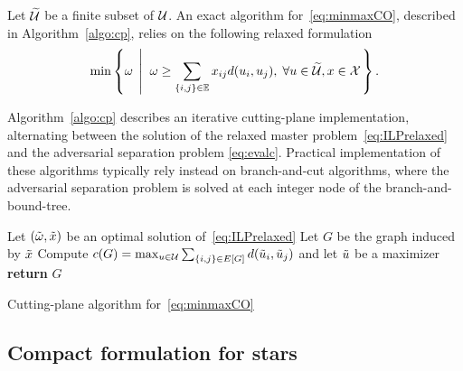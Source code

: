 \documentclass[12pt]{article}
\begin{document}
Let $\widetilde{\mathcal{U}}$ be a finite subset of $\mathcal{U}$. An exact algorithm for~\ref{eq:minmaxCO}, described in Algorithm~\ref{algo:cp}, relies on the following relaxed formulation
\begin{equation}
\label{eq:ILPrelaxed}
\min\left\{\omega \; \left|\;\; \omega \geq \sum_{\{i,j\}\in \mathbb{E}} x_{ij} d(u_i,u_j), \; \forall u\in\widetilde{\mathcal{U}}, x \in \mathcal{X} \right.\right\}.
\end{equation}

Algorithm~\ref{algo:cp} describes an iterative cutting-plane implementation, alternating between the solution of the relaxed master problem~\eqref{eq:ILPrelaxed} and the adversarial separation problem \ref{eq:evalc}. Practical implementation of these algorithms typically rely instead on branch-and-cut algorithms, where the adversarial separation problem is solved at each integer node of the branch-and-bound-tree. 

\begin{algorithm}
\DontPrintSemicolon
{}
{
Let $(\tilde{\omega},\tilde{x})$ be an optimal solution of~\eqref{eq:ILPrelaxed}\;
Let $G$ be the graph induced by $\tilde{x}$\;
Compute $c(G)=\max_{u\in\mathcal{U}}\sum_{\{i,j\}\in E[G]} d(\tilde{u}_i,\tilde{u}_j)$ and let $\tilde{u}$ be a maximizer\;
}
\textbf{return} $G$
\caption{Cutting-plane algorithm for~\ref{eq:minmaxCO}}
\label{algo:cp}
\end{algorithm}


\subsection{Compact formulation for stars}
\label{sec:compact}
\end{document}
